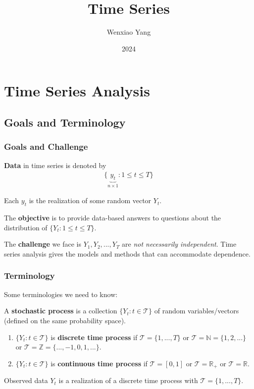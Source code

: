 \documentclass[11pt]{elegantbook}
\title{Time Series}
\author{Wenxiao Yang}
\institute{Haas School of Business, University of California Berkeley}
\date{2024}
\begin{document}
\maketitle

\frontmatter
\tableofcontents

\mainmatter

\chapter{Time Series Analysis}
\section{Goals and Terminology}
\subsection*{Goals and Challenge}
\textbf{Data} in time series is denoted by
\begin{equation}
    \begin{aligned}
        \{\underbrace{y_t}_{n\times 1}:1\leq t\leq T\}
    \end{aligned}
    \nonumber
\end{equation}
\begin{assumption}
    Each $y_t$ is the realization of some random vector $Y_t$.
\end{assumption}
The \textbf{objective} is to provide data-based answers to questions about the distribution of $\{Y_t:1\leq t\leq T\}$.

The \textbf{challenge} we face is $Y_1,Y_2,...,Y_T$ are \textit{not necessarily independent}. Time series analysis gives the models and methods that can accommodate dependence.

\subsection*{Terminology}
Some terminologies we need to know:
\begin{definition}
    A \textbf{stochastic process} is a collection $\{Y_t:t\in\mathcal{T}\}$ of random variables/vectors (defined on the same probability space).
    \begin{enumerate}
        \item $\{Y_t:t\in\mathcal{T}\}$ is \textbf{discrete time process} if $\mathcal{T}=\{1,...,T\}$ or $\mathcal{T}=\mathbb{N}=\{1,2,...\}$ or $\mathcal{T}=\mathbb{Z}=\{...,-1,0,1,...\}$.
        \item $\{Y_t:t\in\mathcal{T}\}$ is \textbf{continuous time process} if $\mathcal{T}=[0,1]$ or $\mathcal{T}=\mathbb{R}_+$ or $\mathcal{T}=\mathbb{R}$.
    \end{enumerate}
\end{definition}
Observed data $Y_t$ is a realization of a discrete time process with $\mathcal{T}=\{1,...,T\}$.
\end{document}
